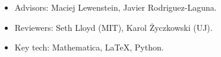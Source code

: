 \documentclass[10pt,a4paper,ragged2e,withhyper]{altacv}
\begin{document}
\begin{paracol}{2}
\divider

\begin{itemize}
\item Advisors: Maciej Lewenstein, Javier Rodriguez-Laguna.
\item Reviewers: Seth Lloyd (MIT), Karol Życzkowski (UJ).
\item Key tech: Mathematica, LaTeX, Python.
\end{itemize}









\end{paracol}
\end{document}
